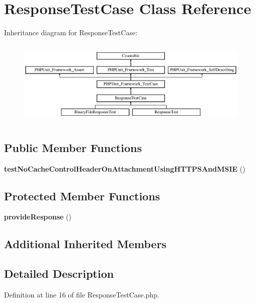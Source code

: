 \section{Response\+Test\+Case Class Reference}
\label{class_symfony_1_1_component_1_1_http_foundation_1_1_tests_1_1_response_test_case}
Inheritance diagram for Response\+Test\+Case\+:\begin{figure}[H]
\begin{center}
\leavevmode
\includegraphics[height=4.129793cm]{class_symfony_1_1_component_1_1_http_foundation_1_1_tests_1_1_response_test_case}
\end{center}
\end{figure}
\subsection*{Public Member Functions}
\begin{DoxyCompactItemize}
\item 
{\bf test\+No\+Cache\+Control\+Header\+On\+Attachment\+Using\+H\+T\+T\+P\+S\+And\+M\+S\+I\+E} ()
\end{DoxyCompactItemize}
\subsection*{Protected Member Functions}
\begin{DoxyCompactItemize}
\item 
{\bf provide\+Response} ()
\end{DoxyCompactItemize}
\subsection*{Additional Inherited Members}


\subsection{Detailed Description}


Definition at line 16 of file Response\+Test\+Case.\+php.



